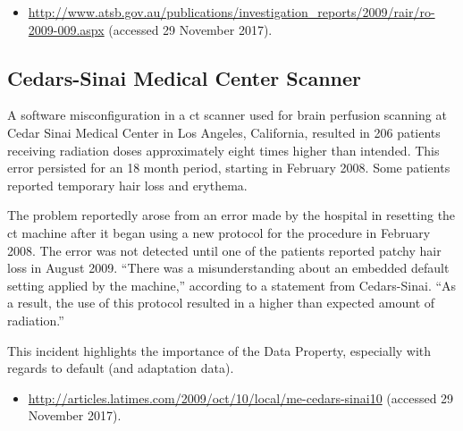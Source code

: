 \begin{samepage}
\begin{itemize}
	\item \raggedright{\href{http://www.atsb.gov.au/publications/investigation_reports/2009/rair/ro-2009-009.aspx}{http://www.atsb.gov.au/publications/investigation\_reports/2009/rair/ro-2009-009.aspx} (accessed 29 November 2017).}
\end{itemize}
\end{samepage}


\subsection{\protect Cedars-Sinai Medical Center\protect{} Scanner} \label{bkm:incacc:cedarssinai}
A software misconfiguration in a \gls{ct} scanner used for brain perfusion scanning at Cedar Sinai Medical Center in Los Angeles, California, resulted in 206 patients receiving radiation doses approximately eight times higher than intended. This error persisted for an 18 month period, starting in February 2008. Some patients reported temporary hair loss and erythema. 

The problem reportedly arose from an error made by the hospital in resetting the \gls{ct} machine after it began using a new protocol for the procedure in February 2008. The error was not detected until one of the patients reported patchy hair loss in August 2009. ``There was a misunderstanding about an embedded default setting applied by the machine,'' according to a statement from Cedars-Sinai. ``As a result, the use of this protocol resulted in a higher than expected amount of radiation.'' 

This incident highlights the importance of the  Data Property, especially with regards to default (and \gls{adaptation data}).

\begin{samepage}
\begin{itemize}
  \item \raggedright{\href{http://articles.latimes.com/2009/oct/10/local/me-cedars-sinai10}{http://articles.latimes.com/2009/oct/10/local/me-cedars-sinai10} (accessed 29 November 2017).}
\end{itemize}
\end{samepage}


